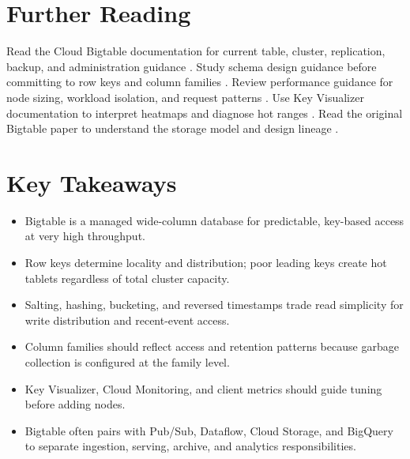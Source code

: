 \section{Further Reading}
Read the Cloud Bigtable documentation for current table, cluster, replication, backup, and administration guidance \cite{googlecloudbigtabledocs}. Study schema design guidance before committing to row keys and column families \cite{googlecloudbigtableschemadocs}. Review performance guidance for node sizing, workload isolation, and request patterns \cite{googlecloudbigtableperformance}. Use Key Visualizer documentation to interpret heatmaps and diagnose hot ranges \cite{googlecloudbigtablekeyvisualizer}. Read the original Bigtable paper to understand the storage model and design lineage \cite{chang2008bigtable}.

\section*{Key Takeaways}
\begin{itemize}
    \item Bigtable is a managed wide-column database for predictable, key-based access at very high throughput.
    \item Row keys determine locality and distribution; poor leading keys create hot tablets regardless of total cluster capacity.
    \item Salting, hashing, bucketing, and reversed timestamps trade read simplicity for write distribution and recent-event access.
    \item Column families should reflect access and retention patterns because garbage collection is configured at the family level.
    \item Key Visualizer, Cloud Monitoring, and client metrics should guide tuning before adding nodes.
    \item Bigtable often pairs with Pub/Sub, Dataflow, Cloud Storage, and BigQuery to separate ingestion, serving, archive, and analytics responsibilities.
\end{itemize}

